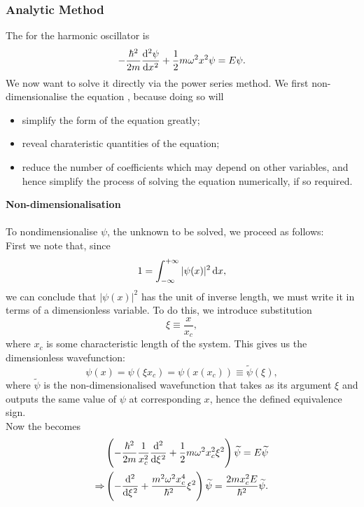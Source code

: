 \subsubsection{Analytic Method}
The \sch for the harmonic oscillator is 
\begin{equation}
-\frac{\hbar^2}{2m}\diff[2]{\psi}{x}+\frac{1}{2}m\omega^2x^2\psi=E\psi.
\end{equation}
We now want to solve it directly via the power series method. We first non-dimensionalise the equation \cite{nond_wiki}, because doing so will 
\begin{itemize}
	\item simplify the form of the equation greatly;
	\item reveal charateristic quantities of the equation;
	\item reduce the number of coefficients which may depend on other variables, and hence simplify the process of 
	solving the equation numerically, if so required. 
\end{itemize}
\textbf{Non-dimensionalisation}\\
\ \\
To nondimensionalise $\psi$, the unknown to be solved, we proceed as follows: \\
First we note that, since 
\begin{equation}
1=\intinf|\psi(x)|^2\dx,
\end{equation}
we can conclude that $|\psi(x)|^2$ has the unit of inverse length, 
we must write it in terms of a dimensionless variable. To do this, we introduce substitution
\begin{equation}
\xi\equiv\frac{x}{x_c},
\end{equation}
where $x_c$ is some characteristic length of the system. 
This gives us the dimensionless wavefunction:
\begin{equation}
\psi(x)=\psi(\xi x_c)=\psi(x(x_c))\equiv\widetilde{\psi}(\xi), 
\end{equation}
where $\widetilde{\psi}$ is the non-dimensionalised wavefunction that takes as its argument $\xi$ and outputs the same value of $\psi$ at corresponding $x$, hence the defined equivalence sign. \\
Now the \sch becomes 
\begin{subequations}
\begin{align}
&\lf(-\frac{\hbar^2}{2m}\frac{1}{x_c^2}\diff[2]{}{\xi}+\frac{1}{2}m\omega^2x_c^2\xi^2\rt)\widetilde{\psi}=E\widetilde{\psi} \\
\imp&\lf(-\diff[2]{}{\xi}+\frac{m^2\omega^2x_c^4}{\hbar^2}\xi^2 \rt)\widetilde{\psi}=\frac{2mx_c^2E}{\hbar^2}\widetilde{\psi}.
\end{align}
\end{subequations}
